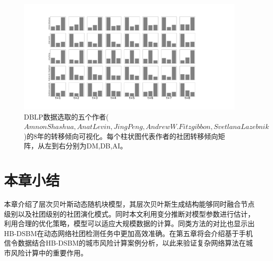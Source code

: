  \begin{figure}[htbp]
 	\centering
	\includegraphics[width=.9\textwidth]{./figure/nodes_evoluton1.pdf}
	\caption{DBLP数据选取的五个作者($Amnon Shashua, Anat Levin, Jing Peng, Andrew  W. Fitzgibbon, Svetlana Lazebnik$)的$8$年的转移倾向可视化。每个柱状图代表作者的社团转移倾向矩阵，从左到右分别为DM,DB,AI。}
	\label{fig.4.8}
\end{figure}

\section{本章小结}
本章介绍了层次贝叶斯动态随机块模型，其层次贝叶斯生成结构能够同时融合节点级别以及社团级别的社团演化模式。同时本文利用变分推断对模型参数进行估计，利用合理的优化策略，模型可以适应大规模数据的计算。同类方法的对比也显示出HB-DSBM在动态网络社团检测任务中更加高效准确。在第五章将会介绍基于手机信令数据结合HB-DSBM的城市风险计算案例分析，以此来验证复杂网络算法在城市风险计算中的重要作用。